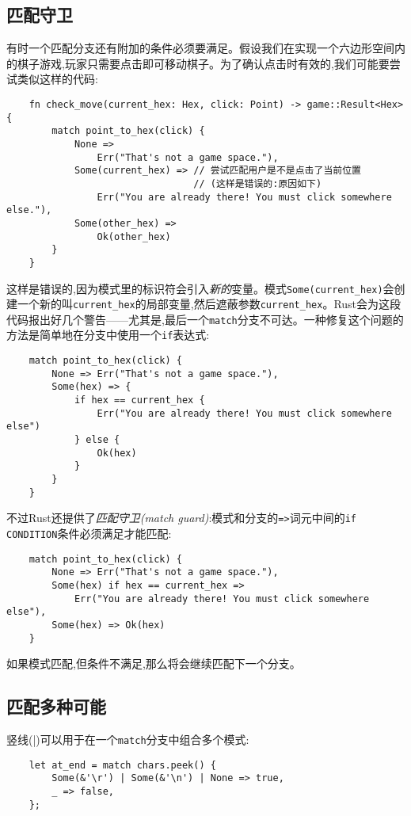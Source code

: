 \subsection{匹配守卫}
有时一个匹配分支还有附加的条件必须要满足。假设我们在实现一个六边形空间内的棋子游戏,玩家只需要点击即可移动棋子。为了确认点击时有效的,我们可能要尝试类似这样的代码:
\begin{verbatim}
    fn check_move(current_hex: Hex, click: Point) -> game::Result<Hex> {
        match point_to_hex(click) {
            None =>
                Err("That's not a game space."),
            Some(current_hex) => // 尝试匹配用户是不是点击了当前位置
                                 // (这样是错误的:原因如下)
                Err("You are already there! You must click somewhere else."),
            Some(other_hex) =>
                Ok(other_hex)
        }
    }
\end{verbatim}

这样是错误的,因为模式里的标识符会引入\emph{新的}变量。模式\texttt{Some(current\_hex)}会创建一个新的叫\texttt{current\_hex}的局部变量,然后遮蔽参数\texttt{current\_hex}。Rust会为这段代码报出好几个警告——尤其是,最后一个\texttt{match}分支不可达。一种修复这个问题的方法是简单地在分支中使用一个\texttt{if}表达式:
\begin{verbatim}
    match point_to_hex(click) {
        None => Err("That's not a game space."),
        Some(hex) => {
            if hex == current_hex {
                Err("You are already there! You must click somewhere else")
            } else {
                Ok(hex)
            }
        }
    }
\end{verbatim}

不过Rust还提供了\emph{匹配守卫(match guard)}:模式和分支的\texttt{=>}词元中间的\texttt{if CONDITION}条件必须满足才能匹配:
\begin{verbatim}
    match point_to_hex(click) {
        None => Err("That's not a game space."),
        Some(hex) if hex == current_hex =>
            Err("You are already there! You must click somewhere else"),
        Some(hex) => Ok(hex)
    }
\end{verbatim}

如果模式匹配,但条件不满足,那么将会继续匹配下一个分支。

\subsection{匹配多种可能}
竖线(|)可以用于在一个\texttt{match}分支中组合多个模式:
\begin{verbatim}
    let at_end = match chars.peek() {
        Some(&'\r') | Some(&'\n') | None => true,
        _ => false,
    };
\end{verbatim}

